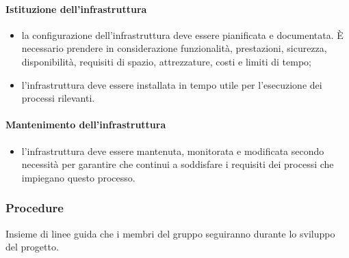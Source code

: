 		\paragraph{Istituzione dell'infrastruttura}
		\begin{itemize}
			\item la configurazione dell'infrastruttura deve essere pianificata e documentata. È necessario prendere in considerazione funzionalità, prestazioni, sicurezza, disponibilità, requisiti di spazio, attrezzature, costi e limiti di tempo;
			\item l'infrastruttura deve essere installata in tempo utile per l'esecuzione dei processi rilevanti.
		\end{itemize}
		\paragraph{Mantenimento dell'infrastruttura}
		\begin{itemize}
			\item l'infrastruttura deve essere mantenuta, monitorata e modificata secondo necessità per garantire che continui a soddisfare i requisiti dei processi che impiegano questo processo. 
		\end{itemize}
		\subsubsection{Procedure}
		Insieme di linee guida che i membri del gruppo seguiranno durante lo sviluppo del progetto.
